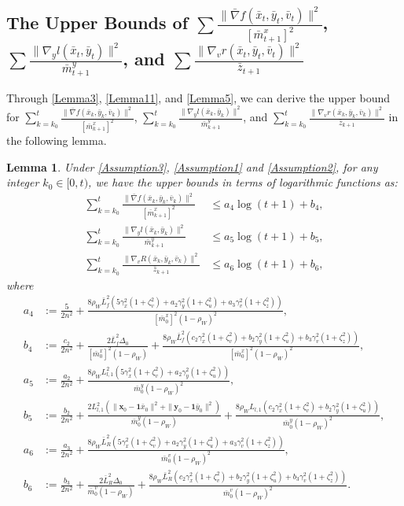 \documentclass{article}
\theoremstyle{plain}
\newtheorem{lemma}[lemma]{Lemma}
\theoremstyle{definition}
\theoremstyle{remark}
\begin{document}
\subsection{The Upper Bounds of $\sum \frac{\| \bar{\nabla} f(\bar{x}_{t},\bar{y}_{t},\bar{v}_{t})\|^2}{[\bar{m}^x_{t+1}]^2}$, $\sum \frac{\|\nabla_y l(\bar{x}_t, \bar{y}_t)\|^2}{\bar{m}^y_{t+1}}$, and $\sum \frac{\|\nabla_v r(\bar{x}_t, \bar{y}_t, \bar{v}_t)\|^2}{\bar{z}_{t+1}}$}\label{secc80}
Through \cref{Lemma3}, \cref{Lemma11}, and \cref{Lemma5}, we can derive the upper bound for $\sum_{k=k_0}^t \frac{\|\bar{\nabla} f(\bar{x}_k,\bar{y}_k,\bar{v}_k)\|^2}{[\bar{m}^x_{k+1}]^2} $, $\sum_{k=k_0}^t \frac{\|\nabla_y l(\bar{x}_k, \bar{y}_k)\|^2}{\bar{m}^y_{k+1}}$, and $\sum_{k=k_0}^t \frac{\|\nabla_v r(\bar{x}_k, \bar{y}_k, \bar{v}_k)\|^2}{\bar{z}_{k+1}}$ in the following lemma. 
\begin{lemma}\label{lemmanew12}
Under \cref{Assumption3}, \cref{Assumption1} and \cref{Assumption2}, for any integer $k_0 \in [0, t)$, we have the upper bounds in terms of logarithmic functions as:
\begin{align}
\sum_{k=k_0}^t \frac{\|\bar{\nabla} f(\bar{x}_k,\bar{y}_k,\bar{v}_k)\|^2}{[\bar{m}^x_{k+1}]^2} &\leq{a_4\log(t + 1)+b_4},\nonumber\\
\sum_{k=k_0}^t \frac{\|\nabla_y l(\bar{x}_k, \bar{y}_k)\|^2}{\bar{m}^y_{k+1}} &\leq {a_5 \log(t + 1)+b_5}, \nonumber\\
\sum_{k=k_0}^t \frac{\|\nabla_v R(\bar{x}_k, \bar{y}_k, \bar{v}_k)\|^2}{\bar{z}_{k+1}} &\leq {a_6 \log(t + 1) + b_6},\label{eqnewlemma}
\end{align}
where
\begin{align}
a_4&:=\frac{5}{2n^2}+ \frac{8\rho_W\bar{L}_{f}^2(5 \gamma_x^2 (1 + \zeta_v^2)+a_2 \gamma_y^2 (1 + \zeta_u^2)+a_3 \gamma_v^2  (1 + \zeta_z^2))}{[\bar{m}_0^x]^2(1 - \rho_W)^2 }, \nonumber\\
b_4&:=\frac{c_2}{2n^2}+\frac{2\bar{L}_{f}^2 \Delta_0}{[\bar{m}^x_0]^2(1 - \rho_W)}+\frac{8\rho_W\bar{L}_{f}^2(c_2 \gamma_x^2  (1 + \zeta_v^2)+b_2\gamma_y^2 (1 + \zeta_u^2)+b_3\gamma_v^2 (1 + \zeta_z^2))}{[\bar{m}^x_0]^2(1 - \rho_W)^2 }, \nonumber\\
a_5&:=\frac{a_2}{2n^2}+ \frac{8\rho_WL_{l,1}^2(5 \gamma_x^2 (1 + \zeta_v^2)+a_2 \gamma_y^2 (1 + \zeta_u^2))}{\bar{m}_0^y(1 - \rho_W)^2 }, \nonumber\\
b_5&:=\frac{b_2}{2n^2}+\frac{2L_{l,1}^2  (\|\mathbf{x}_{0} - \mathbf{1} \bar{x}_{0} \|^2+\|\mathbf{y}_{0} - \mathbf{1} \bar{y}_{0} \|^2)}{\bar{m}^y_0(1 - \rho_W)}+\frac{8\rho_WL_{l,1}(c_2 \gamma_x^2  (1 + \zeta_v^2)+b_2\gamma_y^2 (1 + \zeta_u^2))}{\bar{m}^y_0(1 - \rho_W)^2 }, \nonumber\\
a_6&:=\frac{a_3}{2n^2}+ \frac{8\rho_W\bar{L}_{R}^2(5 \gamma_x^2 (1 + \zeta_v^2)+a_2 \gamma_y^2 (1 + \zeta_u^2)+a_3 \gamma_v^2  (1 + \zeta_z^2))}{\bar{m}_0^v(1 - \rho_W)^2 }, \nonumber\\
b_6&:=\frac{b_3}{2n^2}+\frac{2\bar{L}_{R}^2 \Delta_0}{\bar{m}^v_0(1 - \rho_W)}+\frac{8\rho_W\bar{L}_{R}^2(c_2 \gamma_x^2  (1 + \zeta_v^2)+b_2\gamma_y^2 (1 + \zeta_u^2)+b_3\gamma_v^2 (1 + \zeta_z^2))}{\bar{m}^v_0(1 - \rho_W)^2 }.
\label{eqnewlemma13}
\end{align}
\end{lemma}
\end{document}
